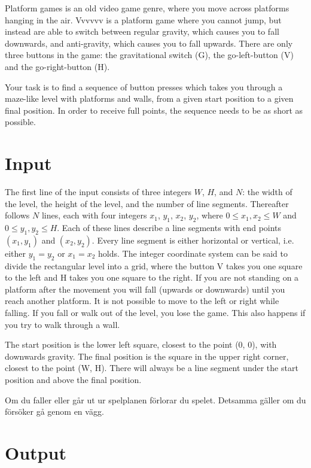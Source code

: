 

Platform games is an old video game genre, where you move across platforms hanging in the air. Vvvvvv is a platform game where you cannot jump, but instead are able to switch between regular gravity, which causes you to fall downwards, and anti-gravity, which causes you to fall upwards. There are only three buttons in the game: the gravitational switch (G), the go-left-button (V) and the go-right-button (H).

Your task is to find a sequence of button presses which takes you through a maze-like level with platforms and walls, from a given start position to a given final position. In order to receive full points, the sequence needs to be as short as possible.


\section*{Input}
The first line of the input consists of three integers $W$, $H$, and $N$: the width of the level, the height of the level, and the number of line segments. Thereafter follows $N$ lines, each with four integers $x_1$, $y_1$, $x_2$, $y_2$, where $0 \le x_1, x_2 \le W$ and $0 \le y_1, y_2 \le H$. Each of these lines describe a line segments with end points $(x_1, y_1)$ and $(x_2, y_2)$. Every line segment is either horizontal or vertical, i.e. either $y_1=y_2$ or $x_1=x_2$ holds. The integer coordinate system can be said to divide the rectangular level into a grid, where the button V takes you one square to the left and H takes you one square to the right. If you are not standing on a platform after the movement you will fall (upwards or downwards) until you reach another platform. It is not possible to move to the left or right while falling. If you fall or walk out of the level, you lose the game. This also happens if you try to walk through a wall.

The start position is the lower left square, closest to the point (0, 0), with downwards gravity. The final position is the square in the upper right corner, closest to the point (W, H). There will always be a line segment under the start position and above the final position.

Om du faller eller går ut ur spelplanen förlorar du spelet. Detsamma gäller om du försöker gå genom en vägg.


\section*{Output}

